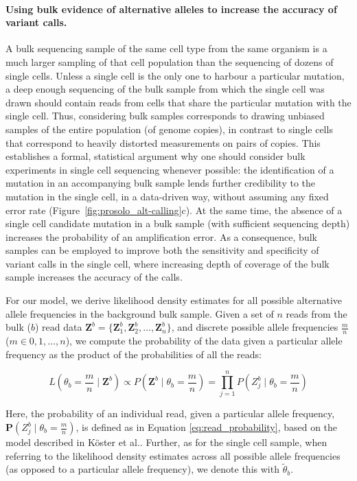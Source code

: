 \documentclass[12pt,inline]{wlscirep}
\newcommand{\Prob}{{\mathbf{P}}}
\begin{document}
\paragraph{Using bulk evidence of alternative alleles to increase the accuracy of variant calls.}
A bulk sequencing sample of the same cell type from the same organism is a much larger sampling of that cell population than the sequencing of dozens of single cells.
Unless a single cell is the only one to harbour a particular mutation, a deep enough sequencing of the bulk sample from which the single cell was drawn should contain reads from cells that share the particular mutation with the single cell.
Thus, considering bulk samples corresponds to drawing unbiased samples of the entire population (of genome copies), in contrast to single cells that correspond to heavily distorted measurements on pairs of copies.
This establishes a formal, statistical argument why one should consider bulk experiments in single cell sequencing whenever possible: the identification of a mutation in an accompanying bulk sample lends further credibility to the mutation in the single cell, in a data-driven way, without assuming any fixed error rate (Figure~\ref{fig:prosolo_alt-calling}c).
At the same time, the absence of a single cell candidate mutation in a bulk sample (with sufficient sequencing depth) increases the probability of an amplification error.
As a consequence, bulk samples can be employed to improve both the sensitivity and specificity of variant calls in the single cell, where increasing depth of coverage of the bulk sample increases the accuracy of the calls. 

For our model, we derive likelihood density estimates for all possible alternative allele frequencies in the background bulk sample.
Given a set of $n$ reads from the bulk ($b$) read data $\boldsymbol{Z}^b  = \{ \boldsymbol{Z}_1^b, \boldsymbol{Z}_2^b, \dots, \boldsymbol{Z}_n^b \}$, and discrete possible allele frequencies $\frac{m}{n}$ ($m \in 0, 1, \dots, n$), we compute the probability of the data given a particular allele frequency as the product of the probabilities of all the reads:

\begin{equation}
 \label{eq:bulk-prob}
 L\left(\theta_b = \frac{m}{n} \mid \boldsymbol{Z}^b\right) \propto
 P\left(\boldsymbol{Z}^b \mid \theta_b = \frac{m}{n}\right) =
 \prod_{j=1}^n P\left(Z_j^b \mid \theta_b = \frac{m}{n} \right)
\end{equation}

Here, the probability of an individual read, given a particular allele frequency, $\Prob(Z_j^b \mid \theta_b = \frac{m}{n})$, is defined as in Equation \ref{eq:read_probability}, based on the model described in Köster et al.\cite{koster_varlociraptor_2020}.
Further, as for the single cell sample, when referring to the likelihood density estimates across all possible allele frequencies (as opposed to a particular allele frequency), we denote this with $\tilde{\theta}_b$.
\end{document}
